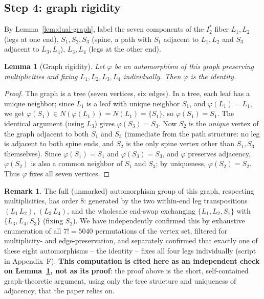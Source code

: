 \documentclass[11pt]{amsart}
\newtheorem{lemma}[theorem]{Lemma}
\theoremstyle{definition}
\newtheorem{remark}[theorem]{Remark}
\begin{document}
\subsection*{Step 4: graph rigidity}

By Lemma~\ref{lem:dual-graph}, label the seven components of the $I_2^*$
fiber $L_1,L_2$ (legs at one end), $S_1,S_2,S_3$ (spine, a path with
$S_1$ adjacent to $L_1,L_2$ and $S_3$ adjacent to $L_3,L_4$), $L_3,L_4$
(legs at the other end).

\begin{lemma}[Graph rigidity]
\label{lem:rigidity}
Let $\varphi$ be an automorphism of this graph preserving multiplicities
and fixing $L_1,L_2,L_3,L_4$ individually. Then $\varphi$ is the
identity.
\end{lemma}

\begin{proof}
The graph is a tree (seven vertices, six edges). In a tree, each leaf has
a unique neighbor; since $L_1$ is a leaf with unique neighbor $S_1$, and
$\varphi(L_1)=L_1$, we get $\varphi(S_1)\in N(\varphi(L_1))=N(L_1)=\{S_1\}$,
so $\varphi(S_1)=S_1$. The identical argument (using $L_3$) gives
$\varphi(S_3)=S_3$. Now $S_2$ is the \emph{unique} vertex of the graph
adjacent to both $S_1$ and $S_3$ (immediate from the path structure: no
leg is adjacent to both spine ends, and $S_2$ is the only spine vertex
other than $S_1,S_3$ themselves). Since $\varphi(S_1)=S_1$ and
$\varphi(S_3)=S_3$, and $\varphi$ preserves adjacency, $\varphi(S_2)$ is
also a common neighbor of $S_1$ and $S_3$; by uniqueness,
$\varphi(S_2)=S_2$. Thus $\varphi$ fixes all seven vertices.
\end{proof}

\begin{remark}
The full (unmarked) automorphism group of this graph, respecting
multiplicities, has order $8$: generated by the two within-end leg
transpositions $(L_1\,L_2)$, $(L_3\,L_4)$, and the wholesale end-swap
exchanging $\{L_1,L_2,S_1\}$ with $\{L_3,L_4,S_3\}$ (fixing $S_2$). We
have independently confirmed this by exhaustive enumeration of all
$7!=5040$ permutations of the vertex set, filtered for multiplicity- and
edge-preservation, and separately confirmed that exactly one of these
eight automorphisms -- the identity -- fixes all four legs individually
(script in Appendix~F). \textbf{This computation is cited here as an
independent check on Lemma~\ref{lem:rigidity}, not as its proof}: the
proof above is the short, self-contained graph-theoretic argument, using
only the tree structure and uniqueness of adjacency, that the paper
relies on.
\end{remark}
\end{document}
